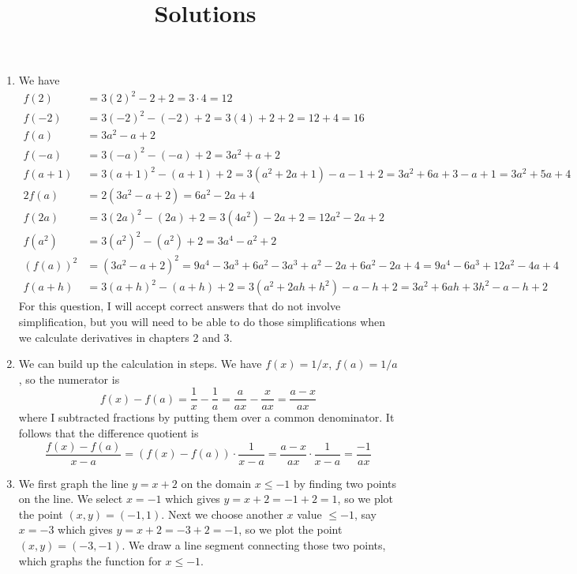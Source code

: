 \documentclass{article}
\title{\commonPSTitleZeroOneOne\ Solutions}
\author{\commonAuthor}
\date{\commonDateZeroOneOne}
\begin{document}
\maketitle
\begin{enumerate}
\item %
  We have
  \begin{align*}
    f(2) &= 3(2)^2-2+2 = 3\cdot 4 = 12 \\
    f(-2) &= 3(-2)^2-(-2) + 2 = 3(4) + 2 + 2 = 12 + 4 = 16 \\
    f(a) &= 3a^2-a+2 \\
    f(-a) &= 3(-a)^2 -(-a) + 2 = 3a^2 + a + 2 \\
    f(a+1) &= 3(a+1)^2 - (a+1) + 2 = 3(a^2+2a+1) - a - 1 + 2
    = 3a^2 + 6a + 3 - a + 1 = 3a^2+5a+4 \\
    2f(a) &= 2(3a^2-a+2) = 6a^2-2a+4 \\
    f(2a) &= 3(2a)^2-(2a) + 2 = 3(4a^2) - 2a + 2 = 12a^2-2a+2 \\
    f(a^2) &= 3(a^2)^2 - (a^2) + 2 = 3a^4-a^2+ 2 \\
   (f(a))^2 &= (3a^2-a+2)^2 = 9a^4 -3a^3 + 6a^2 -3a^3+a^2-2a+6a^2-2a+4
    = 9a^4-6a^3+12a^2-4a+4 \\
    f(a+h) &= 3(a+h)^2 - (a+h) + 2 = 3(a^2 + 2ah + h^2) -a-h+2 = 
    3a^2+6ah+3h^2-a-h+2
  \end{align*}
  For this question, I will accept correct 
  answers that do not involve simplification, but you will need to be able
  to do those simplifications when we calculate derivatives in chapters 2
  and 3.
\item %
  We can build up the calculation in steps.  We have $f(x)=1/x$, $f(a)=1/a$,
  so the numerator is
  \begin{equation*}
    f(x)-f(a) = \frac{1}{x} - \frac{1}{a} = \frac{a}{ax} - \frac{x}{ax}
    = \frac{a-x}{ax}
  \end{equation*}
  where I subtracted fractions by putting them over a common denominator.
  It follows that the difference quotient is
  \begin{equation*}
    \frac{f(x)-f(a)}{x-a} = \left(f(x)-f(a)\right) \cdot \frac{1}{x-a}
    = \frac{a-x}{ax} \cdot \frac{1}{x-a} = \frac{-1}{ax}
  \end{equation*}
\item \label{q:cases} %
  We first graph the line $y=x+2$ on the domain $x\le -1$ by finding two
  points on the line.  We select $x=-1$ which gives $y=x+2=-1+2=1$, so
  we plot the point $(x,y)=(-1,1)$.  Next we choose another $x$ value $\le -1$,
  say $x=-3$ which gives $y=x+2=-3+2=-1$, so we plot the point $(x,y)=(-3,-1)$.
  We draw a line segment connecting those two points, which graphs the
  function for $x\le -1$.


\end{enumerate}
\end{document}
